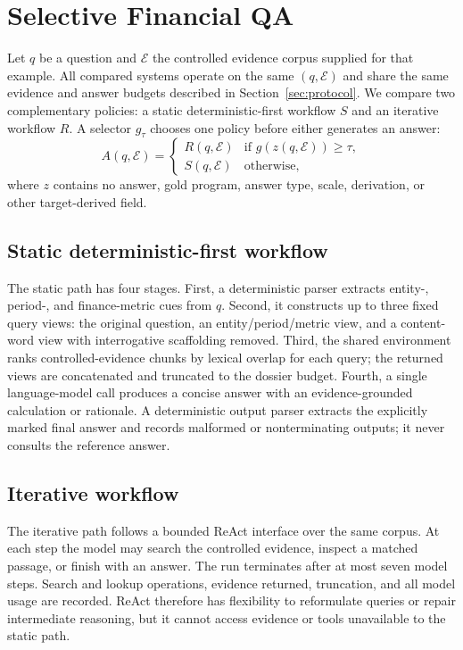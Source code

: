 \section{Selective Financial QA}
\label{sec:method}

Let $q$ be a question and $\mathcal{E}$ the controlled evidence corpus supplied for that example. All compared systems operate on the same $(q,\mathcal{E})$ and share the same evidence and answer budgets described in Section~\ref{sec:protocol}. We compare two complementary policies: a static deterministic-first workflow $S$ and an iterative workflow $R$. A selector $g_\tau$ chooses one policy before either generates an answer:
\begin{equation}
  A(q,\mathcal{E}) =
  \begin{cases}
    R(q,\mathcal{E}) & \text{if } g(z(q,\mathcal{E})) \geq \tau,\\
    S(q,\mathcal{E}) & \text{otherwise,}
  \end{cases}
\end{equation}
where $z$ contains no answer, gold program, answer type, scale, derivation, or other target-derived field.

\subsection{Static deterministic-first workflow}

The static path has four stages. First, a deterministic parser extracts entity-, period-, and finance-metric cues from $q$. Second, it constructs up to three fixed query views: the original question, an entity/period/metric view, and a content-word view with interrogative scaffolding removed. Third, the shared environment ranks controlled-evidence chunks by lexical overlap for each query; the returned views are concatenated and truncated to the dossier budget. Fourth, a single language-model call produces a concise answer with an evidence-grounded calculation or rationale. A deterministic output parser extracts the explicitly marked final answer and records malformed or nonterminating outputs; it never consults the reference answer.

\subsection{Iterative workflow}

The iterative path follows a bounded ReAct interface over the same corpus. At each step the model may search the controlled evidence, inspect a matched passage, or finish with an answer. The run terminates after at most seven model steps. Search and lookup operations, evidence returned, truncation, and all model usage are recorded. ReAct therefore has flexibility to reformulate queries or repair intermediate reasoning, but it cannot access evidence or tools unavailable to the static path.

